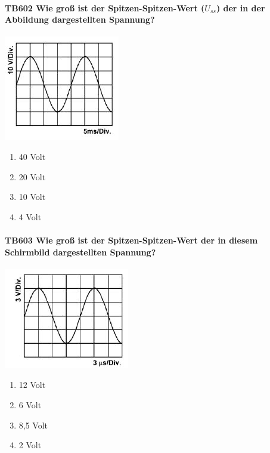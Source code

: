 \documentclass[8pt]{article}
\begin{document}
\begin{enumerate}
\paragraph*{TB602 Wie groß ist der Spitzen-Spitzen-Wert ($U_{ss}$) der in der Abbildung dargestellten Spannung?}
\begin{center}
	\begin{minipage}{\linewidth}
		\centering
		\includegraphics[scale=0.9]{pics/tb602_a.jpg}
	\end{minipage}
\end{center}
\begin{enumerate}[nolistsep,label=\Alph*]
\item 40 Volt
\item 20 Volt
\item 10 Volt
\item 4 Volt
\end{enumerate}



\paragraph*{TB603 Wie groß ist der Spitzen-Spitzen-Wert der in diesem Schirmbild dargestellten Spannung?}
\begin{center}
	\begin{minipage}{\linewidth}
		\centering
		\includegraphics[scale=0.9]{pics/tb603_a.jpg}
	\end{minipage}
\end{center}
\begin{enumerate}[nolistsep,label=\Alph*]
\item 12 Volt
\item 6 Volt
\item 8,5 Volt
\item 2 Volt
\end{enumerate}




\end{enumerate}
\end{document}
